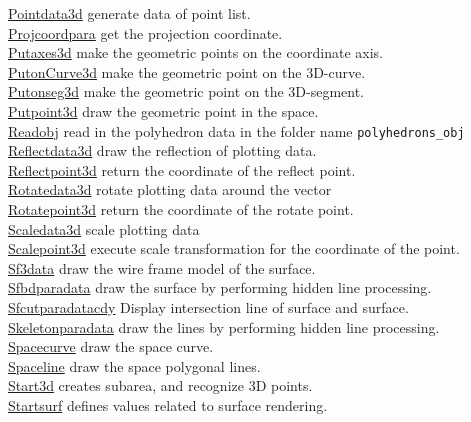 \documentclass[papersize,a4paper,12pt]{article}
\begin{document}
\begin{tabbing}
\hyperlink{pointdata3d}{Pointdata3d} \> generate data of point list.\\
\hyperlink{projcoordpara}{Projcoordpara} \> get the projection coordinate.\\
\hyperlink{putaxes3d}{Putaxes3d} \> make the geometric points on the coordinate axis. \\
\hyperlink{putonCurve3d}{PutonCurve3d} \> make the geometric point on the 3D-curve.\\
\hyperlink{putonseg3d}{Putonseg3d} \> make the geometric point on the 3D-segment.\\
\hyperlink{putpoint3d}{Putpoint3d} \> draw the geometric point in the space.\\
\hyperlink{readobj}{Readobj} \> read in the polyhedron data in the folder name \verb|polyhedrons_obj|\\
\hyperlink{reflectdata3d}{Reflectdata3d} \> draw the reflection of plotting data.\\
\hyperlink{reflectpoint3d}{Reflectpoint3d} \> return the coordinate of the reflect point.\\
\hyperlink{rotatedata3d}{Rotatedata3d} \> rotate plotting data around the vector\\
\hyperlink{rotatepoint3d}{Rotatepoint3d} \> return the coordinate of the rotate point.\\
\hyperlink{scaledata3d}{Scaledata3d} \>scale plotting data \\
\hyperlink{scalepoint3d}{Scalepoint3d} \> execute scale transformation for the coordinate of the point.\\
\hyperlink{sf3data}{Sf3data} \> draw the wire frame model of the surface.\\
\hyperlink{sfbdparadata}{Sfbdparadata} \> draw the surface by performing hidden line processing.\\
\hyperlink{sfcutparadatacdy}{Sfcutparadatacdy} \> Display intersection line of surface and surface.\\
\hyperlink{skeletonparadata}{Skeletonparadata} \> draw the lines by performing hidden line processing.\\
\hyperlink{spacecurve}{Spacecurve} \> draw the space curve.\\
\hyperlink{spaceline}{Spaceline} \> draw the space polygonal lines.\\
\hyperlink{start3d}{Start3d} \> creates subarea, and recognize 3D points.\\
\hyperlink{startsurf}{Startsurf} \> defines values related to surface rendering.\\

\end{tabbing}
\end{document}
